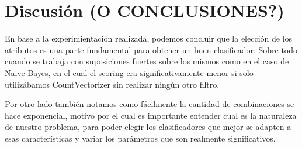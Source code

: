 \section{Discusión (O CONCLUSIONES?)}

En base a la experimientación realizada, podemos concluir que la elección de los atributos es una parte fundamental para obtener un buen clasificador. Sobre todo cuando se trabaja con suposiciones fuertes sobre los mismos como en el caso de Naive Bayes, en el cual el scoring era significativamente menor si solo utilizábamos CountVectorizer sin realizar ningún otro filtro.

Por otro lado también notamos como fácilmente la cantidad de combinaciones se hace exponencial, motivo por el cual es importante entender cual es la naturaleza de nuestro problema, para poder elegir los clasificadores que mejor se adapten a esas características y variar los parámetros que son realmente significativos.




 

